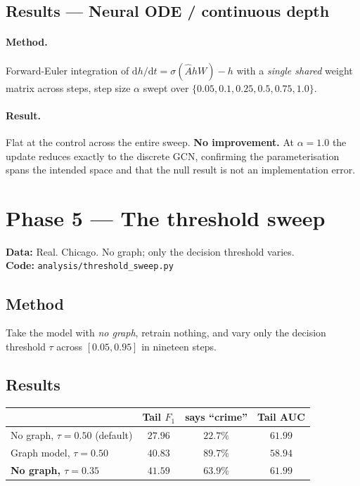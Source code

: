 \documentclass[11pt,a4paper]{article}
\newcommand{\datatag}[2]{%
  \begin{center}\small
  \colorbox{boxbg}{\parbox{0.965\linewidth}{\textbf{Data:} #1 \\ \textbf{Code:} \texttt{#2}}}
  \end{center}}
\newcommand{\verdictbad}[1]{\textcolor{dkred}{\textbf{#1}}}
\begin{document}
\medskip
\noindent{}

\subsection{Results --- Neural ODE / continuous depth}
\paragraph{Method.} Forward-Euler integration of
$\mathrm{d}h/\mathrm{d}t = \sigma(\hat{A}hW) - h$ with a \emph{single shared}
weight matrix across steps, step size $\alpha$ swept over
$\{0.05, 0.1, 0.25, 0.5, 0.75, 1.0\}$.
\paragraph{Result.} Flat at the control across the entire sweep.
\verdictbad{No improvement.} At $\alpha = 1.0$ the update reduces exactly to the
discrete GCN, confirming the parameterisation spans the intended space and that
the null result is not an implementation error.

\section{Phase 5 --- The threshold sweep}\label{sec:sweep}
\datatag{Real. Chicago. No graph; only the decision threshold varies.}{analysis/threshold\_sweep.py}

\subsection{Method}
Take the model with \emph{no graph}, retrain nothing, and vary only the decision
threshold $\tau$ across $[0.05, 0.95]$ in nineteen steps.

\subsection{Results}
\begin{center}
\begin{tabular}{lccc}
\toprule
& Tail $F_1$ & says ``crime'' & Tail AUC \\
\midrule
No graph, $\tau=0.50$ (default) & $27.96$ & $22.7\%$ & $61.99$ \\
Graph model, $\tau=0.50$ & $40.83$ & $89.7\%$ & $58.94$ \\
\textbf{No graph, $\tau=0.35$} & $\mathbf{41.59}$ & $63.9\%$ & $\mathbf{61.99}$ \\
\bottomrule
\end{tabular}
\end{center}
\end{document}
